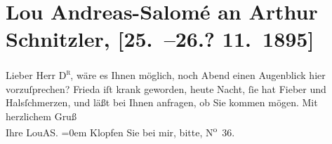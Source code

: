

         
         \renewcommand{\erwaehntePersonen}{Personen: Frieda von Bülow}
         \renewcommand{\erwaehnteOrte}{Orte: Wien}
         \renewcommand{\erwaehnteWerke}{}
               \section[Lou Andreas-Salomé an Arthur Schnitzler, {[}25. –26.? 11. 1895{]}]{ Lou Andreas-Salomé an Arthur Schnitzler, {[}25. –26.? 11. 1895{]}}\nopagebreak{}\rehead{ }\begin{ledgroupsized}[t]{13cm}\normalsize\beginnumbering \toendnotes[C]{\smallbreak\pagebreak[2]} 
\toendnotes[C]{\smallbreak}\pstart{}{\pb}Lieber Herr \textsc{D\textsuperscript{r}},\pend\pstart
           wäre es Ihnen möglich, noch \label{K_L00517_1v}\label{K_L00517_1h} Abend einen Augenblick hier vorzuſprechen? Frieda iſt krank geworden, heute Nacht, ſie hat Fieber und
               Halsſchmerzen, und läßt bei Ihnen anfragen, ob Sie kommen mögen.\pend
           \pstart
           Mit herzlichem Gruß{\\[\baselineskip]}Ihre \spacefill\mbox{LouAS.}\pend
           \leftskip=0em{}\pstart
           \noindent{}Klopfen Sie bei mir, bitte, N\textsuperscript{o} 36.\pend
           
         
         \endnumbering{}\end{ledgroupsized}  \newcommand{\dateiname}{L00517}\newcommand{\titel}{Lou Andreas-Salomé an Arthur Schnitzler, [25. –26.? 11. 1895]}\newcommand{\editorInnen}{Martin Anton Müller und Gerd-Hermann Susen}
      